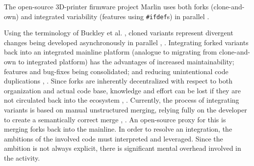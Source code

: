 The open-source 3D-printer firmware project Marlin uses both forks (clone-and-own) and integrated variability (features using \texttt{\#ifdef}s) in parallel \cite{stanciulescu2015}.

Using the terminology of Buckley et al. \cite{buckley2005}, cloned variants represent divergent changes being developed asynchronously in parallel \cite{mens2002}, \cite{stanciulescu2015}. Integrating forked variants back into an integrated mainline platform (analogue to migrating from clone-and-own to integrated platform) has the advantages of increased maintainability; features and bug-fixes being consolidated; and reducing unintentional code duplications \cite{schmorleiz2016similarity}, \cite{stanciulescu2015}. Since forks are inherently decentralized with respect to both organization and actual code base, knowledge and effort can be lost if they are not circulated back into the ecosystem \cite{stanciulescu2015}, \cite{gousios2015}.
Currently, the process of integrating variants is based on manual unstructured merging, relying fully on the developer to create a semantically correct merge \cite{mens2002}, \cite{apel2011}. An open-source proxy for this is merging forks back into the mainline. In order to resolve an integration, the ambitions of the involved code must interpreted and leveraged. Since the ambition is not always explicit, there is significant mental overhead involved in the activity.


